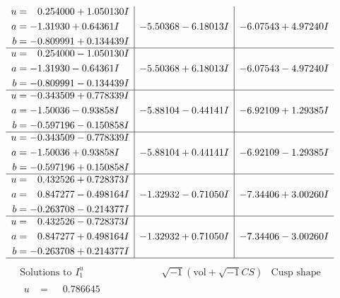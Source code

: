 \documentclass[1p]{elsarticle_modified}
\theoremstyle{definition}
\newcommand{\I}{\sqrt{-1}}
\begin{document}
$$\begin{array}{c|c|c}
\begin{aligned}
u &= \phantom{-}0.254000 + 1.050130 I \\
a &= -1.31930 + 0.64361 I \\
b &= -0.809991 + 0.134439 I\end{aligned}
 & -5.50368 - 6.18013 I & -6.07543 + 4.97240 I \\ \hline\begin{aligned}
u &= \phantom{-}0.254000 - 1.050130 I \\
a &= -1.31930 - 0.64361 I \\
b &= -0.809991 - 0.134439 I\end{aligned}
 & -5.50368 + 6.18013 I & -6.07543 - 4.97240 I \\ \hline\begin{aligned}
u &= -0.343509 + 0.778339 I \\
a &= -1.50036 - 0.93858 I \\
b &= -0.597196 - 0.150858 I\end{aligned}
 & -5.88104 - 0.44141 I & -6.92109 + 1.29385 I \\ \hline\begin{aligned}
u &= -0.343509 - 0.778339 I \\
a &= -1.50036 + 0.93858 I \\
b &= -0.597196 + 0.150858 I\end{aligned}
 & -5.88104 + 0.44141 I & -6.92109 - 1.29385 I \\ \hline\begin{aligned}
u &= \phantom{-}0.432526 + 0.728373 I \\
a &= \phantom{-}0.847277 - 0.498164 I \\
b &= -0.263708 - 0.214377 I\end{aligned}
 & -1.32932 - 0.71050 I & -7.34406 + 3.00260 I \\ \hline\begin{aligned}
u &= \phantom{-}0.432526 - 0.728373 I \\
a &= \phantom{-}0.847277 + 0.498164 I \\
b &= -0.263708 + 0.214377 I\end{aligned}
 & -1.32932 + 0.71050 I & -7.34406 - 3.00260 I\\
 \hline 
 \end{array}$$\newpage$$\begin{array}{c|c|c}  
\text{Solutions to }I^u_{1}& \I (\text{vol} + \sqrt{-1}CS) & \text{Cusp shape}\\
 \hline 
\begin{aligned}
u &= \phantom{-}0.786645\phantom{ +0.000000I} \\

\end{aligned}
\end{array}$$
\end{document}
